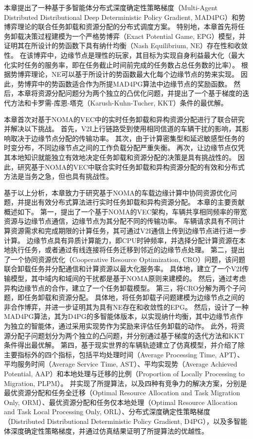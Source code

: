 本章提出了一种基于多智能体分布式深度确定性策略梯度（Multi-Agent Distributed Distributional Deep Deterministic Policy Gradient, MAD4PG）和势博弈理论的联合任务卸载和资源分配的分布式调度方案。
特别地，本章首先将任务卸载决策过程建模为一个严格势博弈（Exact Potential Game, EPG）\cite{chew2016potential}模型，并证明其在所设计的势函数下具有纳什均衡（Nash Equilibrium, NE）存在性和收敛性。
在该博弈中，边缘节点是理性的玩家，其目标为实现自身利益最大化（最大化实时任务的服务率，即在任务截止时间前完成的任务数占总任务数的比率）。
根据势博弈理论，NE可以基于所设计的势函数最大化每个边缘节点的势来实现。
因此，势博弈中的势函数适合作为所提MAD4PG算法中边缘节点的奖励函数。
然后，本章将资源分配问题分为两个独立的凸优化问题，并提出了一个基于梯度的迭代方法和卡罗需-库恩-塔克（Karush-Kuhn-Tucher, KKT）条件的最优解。

本章首次对基于NOMA的VEC中的实时任务卸载和异构资源分配进行了联合研究并解决以下挑战。
首先，V2I上行链路受到使用相同信道的车辆干扰的影响，其影响取决于边缘节点分配的传输功率。
其次，由于计算密集型和延迟敏感型任务的时变分布，不同边缘节点之间的工作负载分配严重失衡。
再次，让边缘节点仅凭其本地知识就能独立有效地决定任务卸载和资源分配的决策是具有挑战性的。
因此，研究基于NOMA的VEC中联合实时任务卸载和异构资源分配的有效和分布式方法是当务之急，但也具有挑战性。

基于以上分析，本章致力于研究基于NOMA的车载边缘计算中协同资源优化问题，并提出有效分布式算法进行实时任务卸载和异构资源分配。
本章的主要贡献概述如下。
第一，提出了一个基于NOMA的VEC架构，车辆共享相同频率的带宽资源与边缘节点通信，边缘节点为其分配不同的传输功率。
车辆请求具有不同计算资源需求和完成期限的计算任务，其可通过V2I通信上传到边缘节点进行进一步计算。
边缘节点具有异质计算能力，即CPU时钟频率，并选择分配计算资源在本地执行任务，或者通过有线连接将任务迁移到邻近的边缘节点处理。
第二，提出了一个协同资源优化（Cooperative Resource Optimization, CRO）问题，该问题联合卸载任务并分配通信和计算资源以最大化服务率。
具体地，建立了一个V2I传输模型，其中域内和域间的干扰都是基于NOMA原则来建模的。
然后，通过考虑异构边缘节点的合作，建立了一个任务卸载模型。
第三，将CRO分解为两个子问题，即任务卸载和资源分配。
具体地，将任务卸载子问题建模为边缘节点之间的非合作博弈，并进一步证明其为具有NE存在和收敛性的EPG。
然后，设计了一种MAD4PG算法，其为D4PG\cite{barth2018distributed}的多智能体版本，以实现纳什均衡，其中边缘节点作为独立的智能体，通过采用实现势作为奖励来评估任务卸载的动作。
此外，将资源分配子问题划分为两个独立的凸问题，并分别通过基于梯度的迭代方法和KKT条件得出最优解。
第四，基于现实世界的车辆轨迹建立了仿真模型，并介绍了除主要指标外的四个指标，包括平均处理时间（Average Processing Time, APT）、平均服务时间（Average Service Time, AST）、平均实现势（Average Achieved Potential, AAP）和本地处理与迁移的比例（Proportion of Locally Processing to Migration, PLPM）。
并实现了所提算法，以及四种有竞争力的解决方案，分别是最优资源分配和任务全迁移（Optimal Resource Allocation and Task Migration Only, ORM）、最优资源分配和任务仅本地处理（Optimal Resource Allocation and Task Local Processing Only, ORL）、分布式深度确定性策略梯度（Distributed Distributional Deterministic Policy Gradient, D4PG）\cite{barth2018distributed}，以及多智能体深度确定性策略梯度\cite{zhang2021adaptive}，并通过仿真结果证明了所提算法的优越性。


